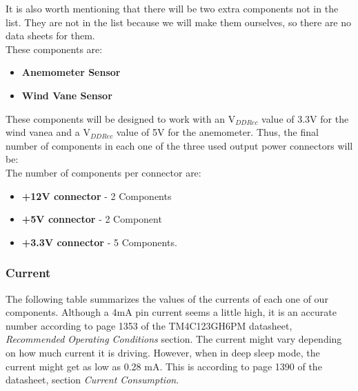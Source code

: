 			It is also worth mentioning that there will be two extra components not in the list. They are not in the list because we will make them ourselves, so there are no data sheets for them. \\ 

			These components are: 
			\begin{itemize}
			  \item \textbf{Anemometer Sensor}
			  \item \textbf{Wind Vane Sensor}
			\end{itemize}  

			These components will be designed to work with an V$_{DD Rec}$ value of 3.3V for the wind vanea and a V$_{DD Rec}$ value of 5V for the anemometer. Thus, the final number of components in each one of the three used output power connectors will be: \\

			The number of components per connector are: 
			\begin{itemize}
			  \item \textbf{+12V connector} - 2 Components
			  \item \textbf{+5V connector} - 2 Component
			  \item \textbf{+3.3V connector} - 5 Components.
			\end{itemize} 

		\subsubsection{Current}

			The following table summarizes the values of the currents of each one of our components. Although a 4mA pin current seems a little high, it is an accurate number according to page 1353 of the TM4C123GH6PM datasheet, \emph{Recommended Operating Conditions} section. The current might vary depending on how much current it is driving. However, when in deep sleep mode, the current might get as low as 0.28 mA. This is according to page 1390 of the datasheet, section \emph{Current Consumption}.

